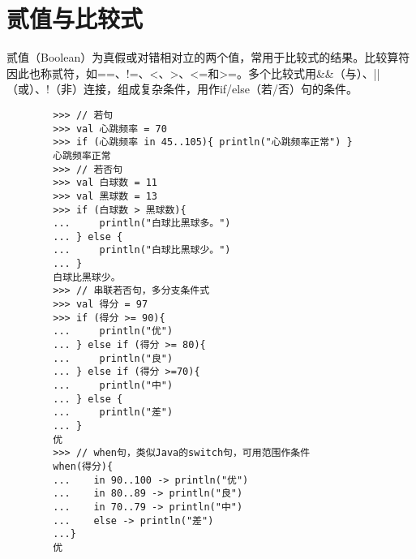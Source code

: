 \section{贰值与比较式}
贰值（Boolean）为真假或对错相对立的两个值，常用于比较式的结果。比较算符因此也称贰符，如==、!=、<、>、<=和>=。多个比较式用\&\&（与）、||（或）、!（非）连接，组成复杂条件，用作if/else（若/否）句的条件。

    \begin{verbatim}
        >>> // 若句
        >>> val 心跳频率 = 70
        >>> if (心跳频率 in 45..105){ println("心跳频率正常") }
        心跳频率正常
        >>> // 若否句
        >>> val 白球数 = 11
        >>> val 黑球数 = 13
        >>> if (白球数 > 黑球数){
        ...     println("白球比黑球多。")
        ... } else {
        ...     println("白球比黑球少。")
        ... }
        白球比黑球少。
        >>> // 串联若否句，多分支条件式
        >>> val 得分 = 97
        >>> if (得分 >= 90){
        ...     println("优")
        ... } else if (得分 >= 80){
        ...     println("良")
        ... } else if (得分 >=70){
        ...     println("中")
        ... } else {
        ...     println("差")
        ... }
        优
        >>> // when句，类似Java的switch句，可用范围作条件
        when(得分){
        ...    in 90..100 -> println("优")
        ...    in 80..89 -> println("良")
        ...    in 70..79 -> println("中")
        ...    else -> println("差")
        ...}
        优
    \end{verbatim}

